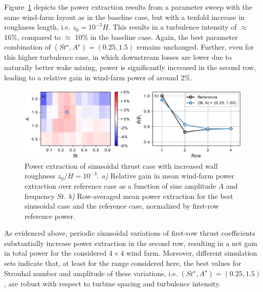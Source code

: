 Figure~\ref{fig:sinus_roughness} depicts the power extraction results from a parameter sweep with the same wind-farm layout as in the baseline case, but with a tenfold increase in roughness length, i.e. $z_0 = 10^{-3}H$. This results in a turbulence intensity of $\approx$ 16\%, compared to $\approx$ 10\% in the baseline case. Again, the best parameter combination of $(St^\star, A^\star) = (0.25, 1.5)$ remains unchanged. Further, even for this higher turbulence case, in which downstream losses are lower due to naturally better wake mixing, power is significantly increased in the second row, leading to a relative gain in wind-farm power of around 2\%. 
\begin{figure}
	\centering
	\includegraphics[width=\textwidth]{chapters/analysis_induction_control/gains_turbulent_6D_6D_6D_wide_antiphase_z0_1m2.eps}
	\caption[Power extraction of sinusoidal thrust case with increased wall roughness $z_0/H = 10^{-3}$.]{Power extraction of sinusoidal thrust case with increased wall roughness $z_0/H = 10^{-3}$. \emph{a) } Relative gain in mean wind-farm power extraction over reference case as a function of sine amplitude $A$ and frequency $St$. \emph{b) } Row-averaged mean power extraction for the best sinusoidal case and the reference case, normalized by first-row reference power.\label{fig:sinus_roughness} }
\end{figure}


As evidenced above, periodic sinusoidal variations of first-row thrust coefficients substantially increase power extraction in the second row, resulting in a net gain in total power for the considered $4\times4$ wind farm. Moreover, different simulation sets indicate that, at least for the range considered here, the best values for Strouhal number and amplitude of these variations, i.e. $(St^\star, A^\star) = (0.25, 1.5)$, are robust with respect to turbine spacing and turbulence intensity. 

